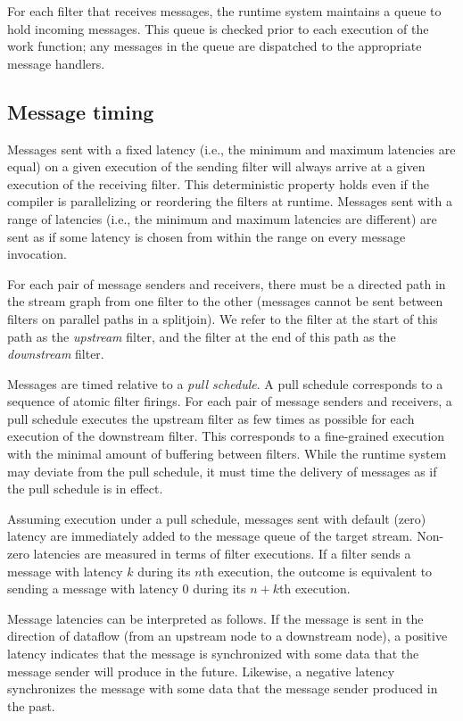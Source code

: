 \documentclass[11pt]{article}
\begin{document}
For each filter that receives messages, the runtime system maintains a
queue to hold incoming messages.  This queue is checked prior to each
execution of the work function; any messages in the queue are
dispatched to the appropriate message handlers.

\subsection{Message timing}

Messages sent with a fixed latency (i.e., the minimum and maximum
latencies are equal) on a given execution of the sending filter will
always arrive at a given execution of the receiving filter.  This
deterministic property holds even if the compiler is parallelizing or
reordering the filters at runtime.  Messages sent with a range of
latencies (i.e., the minimum and maximum latencies are different) are
sent as if some latency is chosen from within the range on every
message invocation.

For each pair of message senders and receivers, there must be a
directed path in the stream graph from one filter to the other
(messages cannot be sent between filters on parallel paths in a
splitjoin).  We refer to the filter at the start of this path as the
{\it upstream} filter, and the filter at the end of this path as the
{\it downstream} filter.

Messages are timed relative to a {\it pull schedule}.  A pull schedule
corresponds to a sequence of atomic filter firings.  For each pair of
message senders and receivers, a pull schedule executes the upstream
filter as few times as possible for each execution of the downstream
filter.  This corresponds to a fine-grained execution with the minimal
amount of buffering between filters.  While the runtime system may
deviate from the pull schedule, it must time the delivery of messages
as if the pull schedule is in effect.

Assuming execution under a pull schedule, messages sent with default
(zero) latency are immediately added to the message queue of the
target stream.  Non-zero latencies are measured in terms of filter
executions.  If a filter sends a message with latency $k$ during its
$n$th execution, the outcome is equivalent to sending a message with
latency 0 during its $n+k$th execution.

Message latencies can be interpreted as follows.  If the message is
sent in the direction of dataflow (from an upstream node to a
downstream node), a positive latency indicates that the message is
synchronized with some data that the message sender will produce in
the future.  Likewise, a negative latency synchronizes the message
with some data that the message sender produced in the past.
\end{document}
